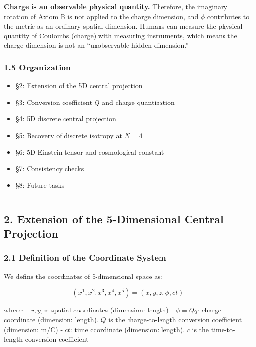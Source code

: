 \documentclass[a4paper,11pt]{article}
\theoremstyle{definition}
\begin{document}
\textbf{Charge is an observable physical quantity.} Therefore, the imaginary rotation of Axiom B is not applied to the charge dimension, and \(\phi\) contributes to the metric as an ordinary spatial dimension. Humans can measure the physical quantity of Coulombs (charge) with measuring instruments, which means the charge dimension is not an ``unobservable hidden dimension.''

\subsubsection{1.5 Organization}\label{organization}

\begin{itemize}
\tightlist
\item
  §2: Extension of the 5D central projection
\item
  §3: Conversion coefficient \(Q\) and charge quantization
\item
  §4: 5D discrete central projection
\item
  §5: Recovery of discrete isotropy at \(N = 4\)
\item
  §6: 5D Einstein tensor and cosmological constant
\item
  §7: Consistency checks
\item
  §8: Future tasks
\end{itemize}

\begin{center}\rule{0.5\linewidth}{0.5pt}\end{center}

\subsection{2. Extension of the 5-Dimensional Central Projection}\label{extension-of-the-5-dimensional-central-projection}

\subsubsection{2.1 Definition of the Coordinate System}\label{definition-of-the-coordinate-system}

We define the coordinates of 5-dimensional space as:

\[(x^1, x^2, x^3, x^4, x^5) = (x, y, z, \phi, ct) \tag{2.1}\]

where: - \(x, y, z\): spatial coordinates (dimension: length) - \(\phi = Qq\): charge coordinate (dimension: length). \(Q\) is the charge-to-length conversion coefficient (dimension: m/C) - \(ct\): time coordinate (dimension: length). \(c\) is the time-to-length conversion coefficient
\end{document}
